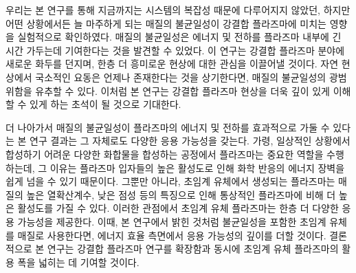 우리는 본 연구를 통해 지금까지는 시스템의 복잡성 때문에 다루어지지 않았던, 하지만 어떤 상황에서든 늘 마주하게 되는 매질의 불균일성이 강결합 플라즈마에 미치는 영향을 실험적으로 확인하였다. 매질의 불균일성은 에너지 및 전하를 플라즈마 내부에 긴 시간 가두는데 기여한다는 것을 발견할 수 있었다. 이 연구는 강결합 플라즈마 분야에 새로운 화두를 던지며, 한층 더 흥미로운 현상에 대한 관심을 이끌어낼 것이다. 자연 현상에서 국소적인 요동은 언제나 존재한다는 것을 상기한다면, 매질의 불균일성의 광범위함을 유추할 수 있다. 이처럼 본 연구는 강결합 플라즈마 현상을 더욱 깊이 있게 이해할 수 있게 하는 초석이 될 것으로 기대한다.

더 나아가서 매질의 불균일성이 플라즈마의 에너지 및 전하를 효과적으로 가둘 수 있다는 본 연구 결과는 그 자체로도 다양한 응용 가능성을 갖는다. 가령, 일상적인 상황에서 합성하기 어려운 다양한 화합물을 합성하는 공정에서 플라즈마는 중요한 역할을 수행하는데, 그 이유는 플라즈마 입자들의 높은 활성도로 인해 화학 반응의 에너지 장벽을 쉽게 넘을 수 있기 때문이다. 그뿐만 아니라, 초임계 유체에서 생성되는 플라즈마는 매질의 높은 열확산계수, 낮은 점성 등의 특징으로 인해 통상적인 플라즈마에 비해 더 높은 활성도를 가질 수 있다. 이러한 관점에서 초임계 유체 플라즈마는 한층 더 다양한 응용 가능성을 제공한다. 이때, 본 연구에서 밝힌 것처럼 불균일성을 포함한 초임계 유체를 매질로 사용한다면, 에너지 효율 측면에서 응용 가능성의 깊이를 더할 것이다. 결론적으로 본 연구는 강결합 플라즈마 연구를 확장함과 동시에 초임계 유체 플라즈마의 활용 폭을 넓히는 데 기여할 것이다.
